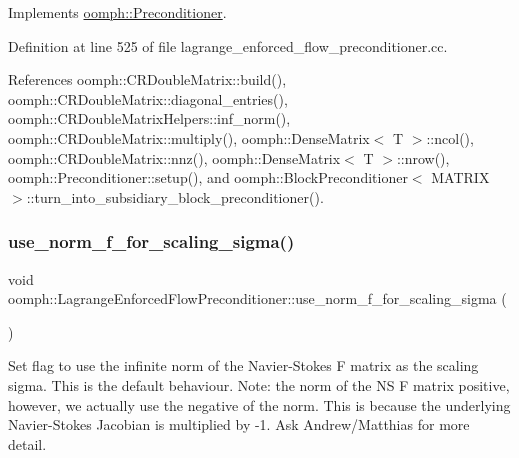 Implements \hyperlink{classoomph_1_1Preconditioner_af4886f4efe510e5c9b0eb19422943588}{oomph\+::\+Preconditioner}.



Definition at line 525 of file lagrange\+\_\+enforced\+\_\+flow\+\_\+preconditioner.\+cc.



References oomph\+::\+C\+R\+Double\+Matrix\+::build(), oomph\+::\+C\+R\+Double\+Matrix\+::diagonal\+\_\+entries(), oomph\+::\+C\+R\+Double\+Matrix\+Helpers\+::inf\+\_\+norm(), oomph\+::\+C\+R\+Double\+Matrix\+::multiply(), oomph\+::\+Dense\+Matrix$<$ T $>$\+::ncol(), oomph\+::\+C\+R\+Double\+Matrix\+::nnz(), oomph\+::\+Dense\+Matrix$<$ T $>$\+::nrow(), oomph\+::\+Preconditioner\+::setup(), and oomph\+::\+Block\+Preconditioner$<$ M\+A\+T\+R\+I\+X $>$\+::turn\+\_\+into\+\_\+subsidiary\+\_\+block\+\_\+preconditioner().

\mbox{\label{classoomph_1_1LagrangeEnforcedFlowPreconditioner_a9a0db8be07c39ebb30f02e4461658efd}} 
\subsubsection{\texorpdfstring{use\+\_\+norm\+\_\+f\+\_\+for\+\_\+scaling\+\_\+sigma()}{use\_norm\_f\_for\_scaling\_sigma()}}
{\footnotesize\ttfamily void oomph\+::\+Lagrange\+Enforced\+Flow\+Preconditioner\+::use\+\_\+norm\+\_\+f\+\_\+for\+\_\+scaling\+\_\+sigma (\begin{DoxyParamCaption}{ }\end{DoxyParamCaption})\hspace{0.3cm}{\ttfamily [inline]}}



Set flag to use the infinite norm of the Navier-\/\+Stokes F matrix as the scaling sigma. This is the default behaviour. Note\+: the norm of the NS F matrix positive, however, we actually use the negative of the norm. This is because the underlying Navier-\/\+Stokes Jacobian is multiplied by -\/1. Ask Andrew/\+Matthias for more detail. 



